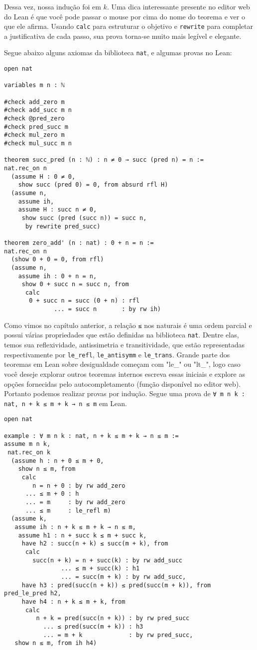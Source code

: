 Dessa vez, nossa indução foi em $k$. Uma dica interessante presente no editor web do Lean é que você pode passar o mouse por cima do nome do teorema e ver o que ele afirma. Usando \lstinline{calc} para estruturar o objetivo e \lstinline{rewrite} para completar a justificativa de cada passo, sua prova torna-se muito mais legível e elegante.

Segue abaixo alguns axiomas da biblioteca \lstinline{nat}, e algumas provas no Lean:

\begin{lstlisting}
open nat

variables m n : ℕ

#check add_zero m
#check add_succ m n
#check @pred_zero
#check pred_succ m
#check mul_zero m
#check mul_succ m n

theorem succ_pred (n : ℕ) : n ≠ 0 → succ (pred n) = n :=
nat.rec_on n
  (assume H : 0 ≠ 0,
    show succ (pred 0) = 0, from absurd rfl H)
  (assume n,
    assume ih,
    assume H : succ n ≠ 0,
     show succ (pred (succ n)) = succ n,
      by rewrite pred_succ)

theorem zero_add' (n : nat) : 0 + n = n :=
nat.rec_on n
  (show 0 + 0 = 0, from rfl)
  (assume n,
    assume ih : 0 + n = n,
     show 0 + succ n = succ n, from
      calc
       0 + succ n = succ (0 + n) : rfl
              ... = succ n       : by rw ih)
\end{lstlisting}

Como vimos no capítulo anterior, a relação \lstinline{≤} nos naturais é uma ordem parcial e possui várias propriedades que estão definidas na biblioteca \lstinline{nat}. Dentre elas, temos sua reflexividade, antissimetria e transitividade, que estão representadas respectivamente por \lstinline{le_refl}, \lstinline{le_antisymm} e \lstinline{le_trans}. Grande parte dos teoremas em Lean sobre desigualdade começam com "le\_" ou "lt\_", logo caso você deseje explorar outros teoremas internos escreva essas iniciais e explore as opções fornecidas pelo autocompletamento (função disponível no editor web). Portanto podemos realizar provas por indução. Segue uma prova de \lstinline{∀ m n k : nat, n + k ≤ m + k → n ≤ m} em Lean.

\begin{lstlisting}
open nat

example : ∀ m n k : nat, n + k ≤ m + k → n ≤ m := 
assume m n k,
 nat.rec_on k 
  (assume h : n + 0 ≤ m + 0,
    show n ≤ m, from 
     calc
        n = n + 0 : by rw add_zero
      ... ≤ m + 0 : h
      ... = m     : by rw add_zero
      ... ≤ m     : le_refl m)
  (assume k,
   assume ih : n + k ≤ m + k → n ≤ m,
    assume h1 : n + succ k ≤ m + succ k,
     have h2 : succ(n + k) ≤ succ(m + k), from 
      calc
        succ(n + k) = n + succ(k) : by rw add_succ
                ... ≤ m + succ(k) : h1
                ... = succ(m + k) : by rw add_succ,
     have h3 : pred(succ(n + k)) ≤ pred(succ(m + k)), from pred_le_pred h2,
     have h4 : n + k ≤ m + k, from 
      calc
         n + k = pred(succ(n + k)) : by rw pred_succ
           ... ≤ pred(succ(m + k)) : h3
           ... = m + k             : by rw pred_succ, 
   show n ≤ m, from ih h4)
\end{lstlisting}


